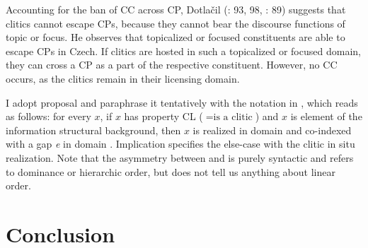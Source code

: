 \documentclass[output=paper,colorlinks,citecolor=brown]{langscibook}
\begin{document}
Accounting for the ban of CC across CP, Dotlačil (\citeyear{Dotlačil2004}: 93, 98, \citeyear{Dotlačil2007}: 89) suggests that clitics cannot escape CPs, because they cannot bear the discourse functions of topic or focus. He observes that topicalized or focused constituents are able to escape CPs in Czech. If clitics are hosted in such a topicalized or focused domain, they can cross a CP as a part of the respective constituent. However, no CC occurs, as the clitics remain in their licensing domain.

I adopt  proposal and paraphrase it tentatively with the notation in , which reads as follows: for every $x$, if $x$ has property CL ($=\text{is a clitic}$) and $x$ is element of the information structural background, then $x$ is realized in domain {\textalpha} and co-indexed with a gap \textit{e} in domain {\textbeta}. Implication  specifies the else-case with the clitic in situ realization. Note that the asymmetry between {\textalpha} and  {\textbeta} is purely syntactic and refers to dominance or hierarchic order, but does not tell us anything about linear order.

\ea\label{kul:ex:background-topic-focus}
\label{kul:ex:background-topic-focus-a}
\label{kul:ex:background-topic-focus-b}
\z
\z

\section{Conclusion}\label{kul:sec:conclusion}
\end{document}
